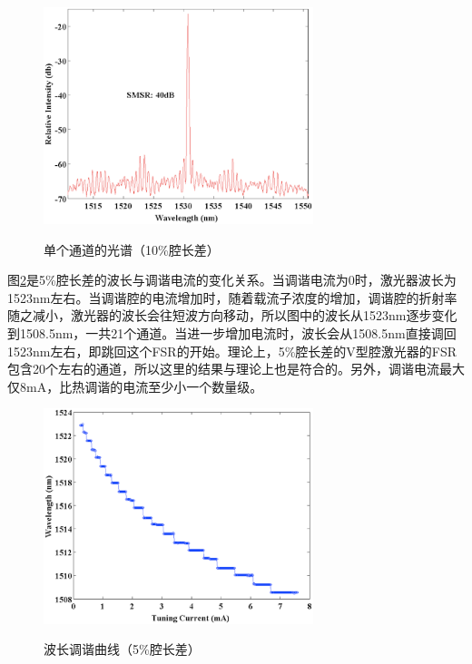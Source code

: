 \documentclass{ZJUthesis}
\begin{document}
\begin{figure}[!ht]
  \centering
  \includegraphics[width=0.7\textwidth]{./Pictures/double_spectrum_p10.eps}\\
  \caption{单个通道的光谱（10\%腔长差）}
  \label{fig_double_spectrum_p10}
\end{figure}

图\ref{fig_double_tuning_p5}是5\%腔长差的波长与调谐电流的变化关系。当调谐电流为0时，激光器波长为1523nm左右。当调谐腔的电流增加时，随着载流子浓度的增加，调谐腔的折射率随之减小，激光器的波长会往短波方向移动，所以图中的波长从1523nm逐步变化到1508.5nm，一共21个通道。当进一步增加电流时，波长会从1508.5nm直接调回1523nm左右，即跳回这个FSR的开始。理论上，5\%腔长差的V型腔激光器的FSR包含20个左右的通道，所以这里的结果与理论上也是符合的。另外，调谐电流最大仅8mA，比热调谐的电流至少小一个数量级。

\begin{figure}[!ht]
  \centering
  \includegraphics[width=0.7\textwidth]{./Pictures/double_tuning_p5.eps}\\
  \caption{波长调谐曲线（5\%腔长差）}
  \label{fig_double_tuning_p5}
\end{figure}
\end{document}
